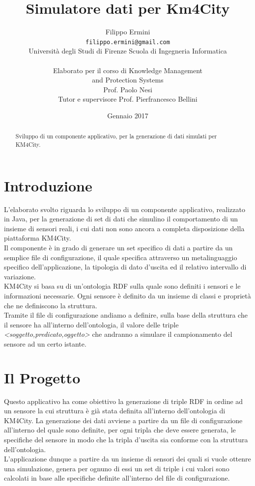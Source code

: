 \documentclass[12pt,a4paper,italian]{article}
\title{\Huge Simulatore dati per Km4City} %
\author{Filippo Ermini\\
	{\tt\small filippo.ermini@gmail.com}\\\small{Università degli Studi di Firenze Scuola di Ingegneria Informatica}\\\\Elaborato per il corso di Knowledge Management \\and Protection Systems\\ Prof. Paolo Nesi\\
	\newline
	\small{Tutor e supervisore Prof. Pierfrancesco Bellini}\\}
\date{Gennaio 2017}
\begin{document}
	\maketitle %
	\thispagestyle{empty}
\begin{abstract}
	Sviluppo di un componente applicativo, per la generazione di dati simulati per KM4City.
\end{abstract}
	\newpage
	\tableofcontents
	\thispagestyle{empty}
	\newpage
	
\section{Introduzione}
\thispagestyle{plain}
L'elaborato svolto riguarda lo sviluppo di un componente applicativo, realizzato in Java, per la generazione di set di dati che simulino il comportamento di un insieme 
di sensori reali, i cui dati non sono ancora a completa disposizione della piattaforma KM4City.\\
Il componente è in grado di generare un set specifico di dati a partire da un semplice file di configurazione, il quale specifica attraverso un metalinguaggio specifico dell'applicazione, 
la tipologia di dato d'uscita ed il relativo intervallo di variazione.\\
KM4City si basa su di un'ontologia RDF sulla quale sono definiti i sensori e le informazioni necessarie. Ogni sensore è definito da un insieme di classi e proprietà che
ne definiscono la struttura.\\
Tramite il file di configurazione andiamo a definire, sulla base della struttura che il sensore ha all'interno dell'ontologia, il valore delle triple \emph{<soggetto,predicato,oggetto>} che andranno
a simulare il campionamento del sensore ad un certo istante.

\newpage
\section{Il Progetto}
\thispagestyle{plain}
Questo applicativo ha come obiettivo la generazione di triple RDF in ordine ad un sensore la cui struttura è già stata definita all'interno dell'ontologia di KM4City.
La generazione dei dati avviene a partire da un file di configurazione all'interno del quale sono definite, per ogni tripla che deve essere generata, le specifiche del sensore in modo che 
la tripla d'uscita sia conforme con la struttura dell'ontologia.\\
L'applicazione dunque a partire da un insieme di sensori dei quali si vuole
ottenre una simulazione, genera per ognuno di essi un set di triple i cui valori sono calcolati in base alle specifiche definite all'interno 
del file di configurazione.\\
\end{document}
